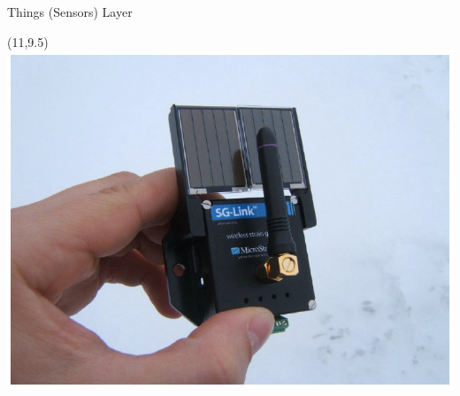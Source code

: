 \documentclass{beamer}
\begin{document}
\begin{frame}[t]{Things (Sensors) Layer}
\begin{itemize}
\begin{itemize}
\begin{textblock}{0.5}(11,9.5)
\includegraphics[scale=0.2]{figure/NodeFig.PNG}
\end{textblock}

\end{itemize}

\end{itemize}
\end{frame}
\end{document}
